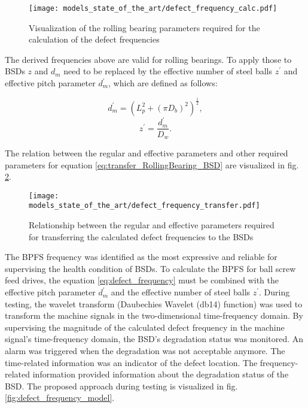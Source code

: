 \begin{figure}[H]
  \centering
  \texttt{[image: models\_state\_of\_the\_art/defect\_frequency\_calc.pdf]}
  \caption{Visualization of the rolling bearing parameters required for the calculation of the defect frequencies \cite{Lee2015}}
  \label{fig:defect_frequency_calc}
\end{figure}

The derived frequencies above are valid for rolling bearings. To apply those to BSDs $z$ and $d_{m}$ need to be replaced by the effective number of steel balls $z^{'}$ and effective pitch parameter $d_{m}^{'}$, which are defined as follows:

\begin{equation} \label{eq:transfer_RollingBearing_BSD}
    d_{m}^{'} = (L_{p}^{2}+(\pi D_{b})^{2})^{\frac{1}{2}},
\end{equation}
\begin{equation}
    z^{'} = \frac{d_{m}^{'}}{D_{w}}.
\end{equation}

The relation between the regular and effective parameters and other required parameters for equation \ref{eq:transfer_RollingBearing_BSD} are visualized in fig. \ref{fig:defect_frequency_transfer}. 

\begin{figure}[H]
  \centering
  \texttt{[image: models\_state\_of\_the\_art/defect\_frequency\_transfer.pdf]}
  \caption{Relationship between the regular and effective parameters required for transferring the calculated defect frequencies to the BSDs \cite{Lee2015}}
  \label{fig:defect_frequency_transfer}
\end{figure}

The BPFS frequency was identified as the most expressive and reliable for supervising the health condition of BSDs. To calculate the BPFS for ball screw feed drives, the equation \ref{eq:defect_frequency} must be combined with the effective pitch parameter $d_{m}^{'}$ and the effective number of steel balls $z^{'}$. During testing, the wavelet transform (Daubechies Wavelet (db14) function) was used to transform the machine signals in the two-dimensional time-frequency domain. By supervising the magnitude of the calculated defect frequency in the machine signal's time-frequency domain, the BSD's degradation status was monitored. An alarm was triggered when the degradation was not acceptable anymore. The time-related information was an indicator of the defect location. The frequency-related information provided information about the degradation status of the BSD. The proposed approach during testing is visualized in fig. \ref{fig:defect_frequency_model}. 



